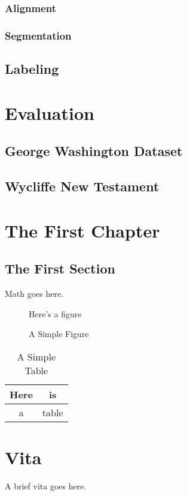 \documentclass[final]{ukthesis}
\begin{document}
\subsection{Alignment}
\subsection{Segmentation}
\section{Labeling}




%
%
%
\chapter{Evaluation}
\section{George Washington Dataset}

\section{Wycliffe New Testament}



\chapter{The First Chapter}
\section{The First Section}
Math goes here.
\begin{figure}[h]
\centering
Here's a figure
\caption{A Simple Figure}
\end{figure}
\begin{table}[h]
\centering
\begin{tabular}{c|c}
Here & is \\
\hline
a & table
\end{tabular}
\caption{A Simple Table}
\end{table}
\copyrightnotice
\backmatter

\chapter{Vita}
A brief vita goes here.
\end{document}
